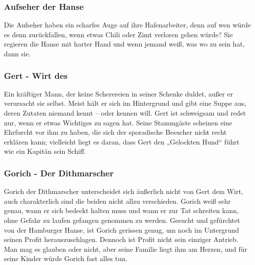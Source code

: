 
\subsubsection*{Aufseher der Hanse}
\label{Aufseher}

Die Aufseher haben ein scharfes Auge auf ihre Hafenarbeiter, denn auf wen würde es denn zurückfallen, wenn etwas Chili oder Zimt verloren gehen würde? Sie regieren die Hanse mit harter Hand und wenn jemand weiß, was wo zu sein hat, dann sie.


\subsubsection*{Gert - Wirt des }
\label{Gert}

Ein kräftiger Mann, der keine Scherereien in seiner Schenke duldet, außer er verursacht sie selbst. Meist hält er sich im Hintergrund und gibt eine Suppe aus, deren Zutaten niemand kennt – oder kennen will. Gert ist schweigsam und redet nur, wenn er etwas Wichtiges zu sagen hat. Seine Stammgäste scheinen eine Ehrfurcht vor ihm zu haben, die sich der sporadische Besucher nicht recht erklären kann; vielleicht liegt es daran, dass Gert den „Gelockten Hund“ führt wie ein Kapitän sein Schiff.

\subsubsection*{Gorich - Der Dithmarscher}
\label{Gorich}

Gorich der Dithmarscher unterscheidet sich äußerlich nicht von Gert dem Wirt, auch charakterlich sind die beiden nicht allzu verschieden. Gorich weiß sehr genau, wann er sich bedeckt halten muss und wann er zur Tat schreiten kann, ohne Gefahr zu laufen gefangen genommen zu werden. Gesucht und gefürchtet von der Hamburger Hanse, ist Gorich gerissen genug, um noch im Untergrund seinen Profit herauszuschlagen. Dennoch ist Profit nicht sein einziger Antrieb. Man mag es glauben oder nicht, aber seine Familie liegt ihm am Herzen, und für seine Kinder würde Gorich fast alles tun.


